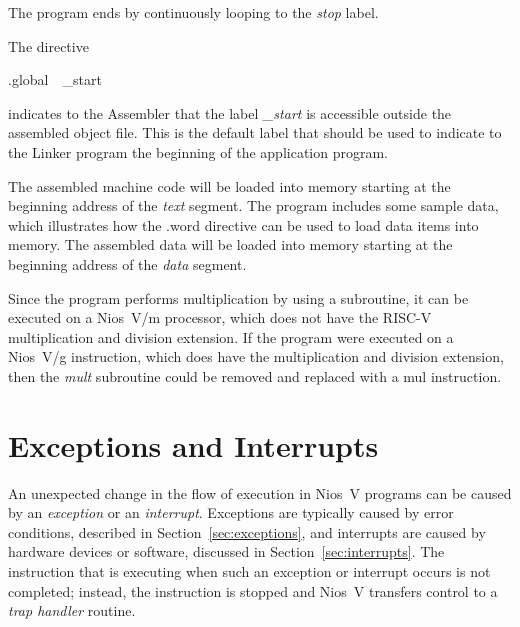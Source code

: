 \documentclass[11pt, twoside, pdftex]{article}
\begin{document}
\noindent
The program ends by continuously looping to the {\it stop} label.

The directive
\vspace{-\baselineskip}
\begin{center}
{\sf .global~~\_start}
\end{center} 
\noindent
indicates to the Assembler that the label {\it \_start} is accessible outside the
assembled object file. This is the default label that should be used to indicate to
the Linker program the beginning of the application program.

The assembled machine code will be loaded into memory starting 
at the beginning address of the {\it text} segment.
The program includes some sample data, which illustrates how the {\sf .word} directive 
can be used to load data items into memory. The assembled data will be loaded into 
memory starting at the beginning address of the {\it data} segment.

Since the program performs multiplication by using a subroutine, it can be executed on a
Nios~V/m processor, which does not have the RISC-V multiplication and division extension.
If the program were executed on a Nios~V/g instruction, which does have the multiplication
and division extension, then the {\it mult} subroutine could be removed and replaced with a
{\sf mul} instruction. 

\section{Exceptions and Interrupts}
\label{sec:traps}

An unexpected change in the flow of execution in Nios~V programs can be caused by an
{\it exception} or an {\it interrupt}. Exceptions are typically caused by error conditions,
described in Section~\ref{sec:exceptions}, and interrupts are caused by hardware devices
or software, discussed in Section~\ref{sec:interrupts}. The instruction that is executing 
when such an exception or interrupt occurs is not completed; instead, the instruction is
stopped and Nios~V transfers control to a {\it trap handler} routine.
\end{document}

